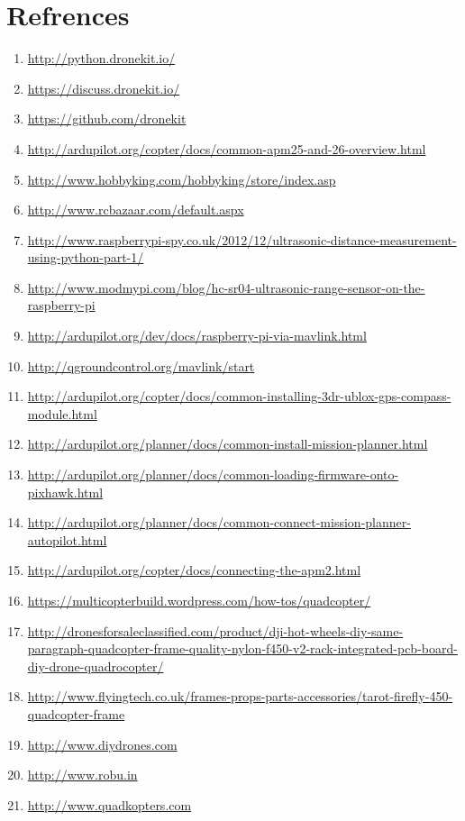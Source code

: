\documentclass[a4paper,12pt,oneside]{book}
\begin{document}
\section{Refrences}
\begin{enumerate}
    \item \url{http://python.dronekit.io/}
    \item \url{https://discuss.dronekit.io/}
    \item \url{https://github.com/dronekit}
    \item \url{http://ardupilot.org/copter/docs/common-apm25-and-26-overview.html}
    \item \url{http://www.hobbyking.com/hobbyking/store/index.asp}
    \item \url{http://www.rcbazaar.com/default.aspx}
    \item \url{http://www.raspberrypi-spy.co.uk/2012/12/ultrasonic-distance-measurement-using-python-part-1/}
    \item  \url{http://www.modmypi.com/blog/hc-sr04-ultrasonic-range-sensor-on-the-raspberry-pi}
    \item \url{http://ardupilot.org/dev/docs/raspberry-pi-via-mavlink.html}
	\item \url{http://qgroundcontrol.org/mavlink/start}
	\item \url{http://ardupilot.org/copter/docs/common-installing-3dr-ublox-gps-compass-module.html}
	\item \url{http://ardupilot.org/planner/docs/common-install-mission-planner.html}
	\item \url{http://ardupilot.org/planner/docs/common-loading-firmware-onto-pixhawk.html}
	\item \url{http://ardupilot.org/planner/docs/common-connect-mission-planner-autopilot.html}
	\item \url{http://ardupilot.org/copter/docs/connecting-the-apm2.html}
	\item \url{https://multicopterbuild.wordpress.com/how-tos/quadcopter/}
	\item \url{http://dronesforsaleclassified.com/product/dji-hot-wheels-diy-same-paragraph-quadcopter-frame-quality-nylon-f450-v2-rack-integrated-pcb-board-diy-drone-quadrocopter/}
	\item \url{http://www.flyingtech.co.uk/frames-props-parts-accessories/tarot-firefly-450-quadcopter-frame}
	\item \url{http://www.diydrones.com}
	\item \url{http://www.robu.in}
	\item \url{http://www.quadkopters.com}
\end{enumerate}
    
    
\end{document}
